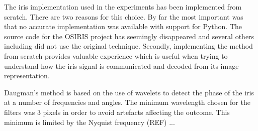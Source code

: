 The iris implementation used in the experiments has been implemented from scratch. There are two reasons for this choice. By far the most important was that no accurate implementation was available with support for Python. The source code for the OSIRIS project \parencite{osiris} has seemingly disappeared and several others including \parencite{rec1, rec2, rec3} did not use the original technique. Secondly, implementing the method from scratch provides valuable experience which is useful when trying to understand how the iris signal is communicated and decoded from its image representation.



Daugman's method is based on the use of wavelets to detect the phase of the iris at a number of frequencies and angles. The minimum wavelength chosen for the filters was 3 pixels in order to avoid artefacts affecting the outcome. This minimum is limited by the Nyquist frequency (REF) ...


